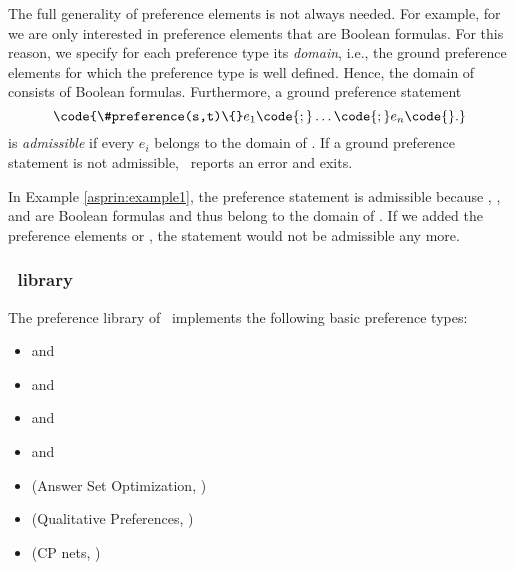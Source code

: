 The full generality of preference elements is not always needed.
%
For example, for  we are only interested in preference elements that are Boolean formulas.
For this reason, we specify for each preference type its \emph{domain}, 
i.e., the ground preference elements for which the preference type is well defined.
Hence, the domain of  consists of Boolean formulas.
Furthermore, a ground preference statement
\[\code{\#preference(s,t)\{}e_1\code{;}\dots\code{;}e_n\code{\}.}\]
is \emph{admissible} if every ${e}_i$ belongs to the domain of .
If a ground preference statement is not admissible, \asprin\ reports an error and exits. 
\begin{example}
In Example \ref{asprin:example1}, the preference statement   
is admissible because , , and  are Boolean formulas
and thus belong to the domain of . 
If we added the preference elements  or , 
the statement would not be admissible any more.
\end{example}

\subsubsection{\asprin\ library}
The preference library of \asprin\ implements the following basic preference types:
\begin{itemize}
	\item  {} and    
	\item  {} and    
	\item  {} and    
	\item  {} and    
	\item  {}   (Answer Set Optimization, \cite{brnitr03a})
	\item  {} (Qualitative Preferences, \cite{rogima10a})
	\item  {} (CP nets, \cite{bobrdohopo04a})
\end{itemize}

